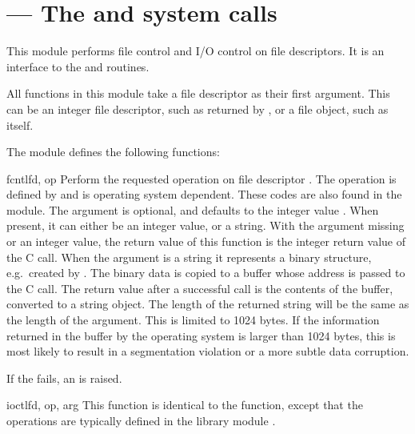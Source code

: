 \section{ ---
         The  and  system calls}



This module performs file control and I/O control on file descriptors.
It is an interface to the  and 
\UNIX{} routines.

All functions in this module take a file descriptor  as their
first argument.  This can be an integer file descriptor, such as
returned by , or a file object, such as
 itself.

The module defines the following functions:


\begin{funcdesc}{fcntl}{fd, op}
  Perform the requested operation on file descriptor .
  The operation is defined by  and is operating system
  dependent.  These codes are also found in the 
  module. The argument  is optional, and defaults to the
  integer value .  When present, it can either be an integer
  value, or a string.  With the argument missing or an integer value,
  the return value of this function is the integer return value of the
  C  call.  When the argument is a string it
  represents a binary structure, e.g.\ created by
  . The binary data is copied to a buffer
  whose address is passed to the C  call.  The
  return value after a successful call is the contents of the buffer,
  converted to a string object.  The length of the returned string
  will be the same as the length of the  argument.  This is
  limited to 1024 bytes.  If the information returned in the buffer by
  the operating system is larger than 1024 bytes, this is most likely
  to result in a segmentation violation or a more subtle data
  corruption.

  If the  fails, an  is
  raised.
\end{funcdesc}

\begin{funcdesc}{ioctl}{fd, op, arg}
  This function is identical to the  function, except
  that the operations are typically defined in the library module
  .
\end{funcdesc}

